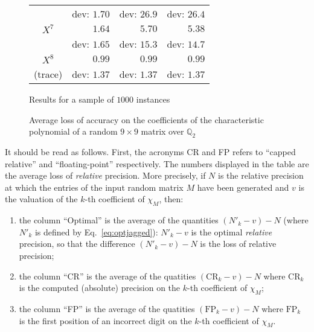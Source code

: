 \documentclass{sig-alternate-05-2015}
\newcommand{\Q}{\mathbb Q}
\begin{document}
\begin{figure}
{\begin{tabular}{|c|r|r|r|}
& {\scriptsize dev: $1.70$} & {\scriptsize dev: $26.9$} & {\scriptsize dev: $26.4$} \\
\rule{0pt}{2.7ex}%
$X^7$ & $1.64$ &   $5.70$           &   $5.38$ \vspace{-1.5ex} \\
& {\scriptsize dev: $1.65$} & {\scriptsize dev: $15.3$} & {\scriptsize dev: $14.7$} \\
\rule{0pt}{2.7ex}%
$X^8$ & $0.99$ &   $0.99$           &   $0.99$ \vspace{-1.5ex} \\
{\scriptsize (trace)} 
& {\scriptsize dev: $1.37$} & {\scriptsize dev: $1.37$} & {\scriptsize dev: $1.37$} \\
\hline
\end{tabular}}
\hfill\null

\medskip

\hfill
{\footnotesize Results for a sample of $1000$ instances}
\hfill\null

\caption{Average loss of accuracy on the coefficients
of the characteristic polynomial of a random $9 \times 9$
matrix over $\Q_2$}
\label{fig:exp}

\end{figure}
%
It should be read as follows. First, the acronyms CR and FP 
refers to ``capped relative'' and ``floating-point'' respectively.
The numbers displayed in the table are the average loss of
\emph{relative} precision. 
More precisely, if $N$ is the relative precision at
which the entries of the input random matrix $M$ have been generated
and $v$ is the valuation of the $k$-th coefficient of $\chi_M$, then:

\vspace{-2mm}

\begin{enumerate}[$\bullet$]
\renewcommand{\itemsep}{0pt}
\item the column ``Optimal'' is the average of the quantities 
$(N'_k{-}v) - N$ (where $N'_k$ is defined by Eq.~\eqref{eq:optjagged}): 
$N'_k{-}v$ is the optimal \emph{relative} precision, so that the
difference $(N'_k{-}v) - N$ is the loss of relative precision;
\item the column ``CR'' is the average of the quatities 
$(\text{CR}_k{-}v) - N$ where $\text{CR}_k$ is the computed (absolute) 
precision on the $k$-th coefficient of $\chi_M$;
\item the column ``FP'' is the average of the quatities 
$(\text{FP}_k{-}v) - N$ where $\text{FP}_k$ is the first position of
an incorrect digit on the $k$-th coefficient of $\chi_M$.
\end{enumerate}
\end{document}

